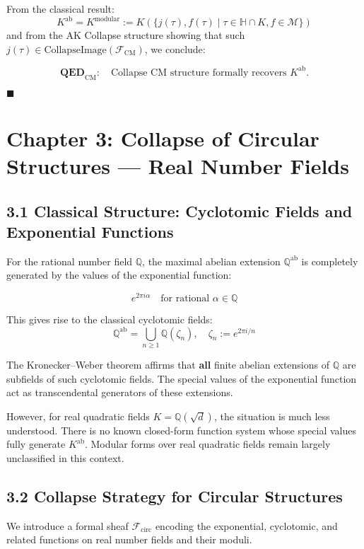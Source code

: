 \documentclass[11pt]{article}
\begin{document}
From the classical result:
\[
K^{\mathrm{ab}} = K^{\text{modular}} := K(\{ j(\tau), f(\tau) \mid \tau \in \mathbb{H} \cap K, f \in \mathcal{M} \})
\]
and from the AK Collapse structure showing that such \( j(\tau) \in \text{CollapseImage}(\mathcal{F}_{\mathrm{CM}}) \),  
we conclude:

\[
\textbf{QED}_{\mathrm{CM}}: \quad \text{Collapse CM structure formally recovers } K^{\mathrm{ab}}.
\]

\hfill $\blacksquare$



\section{Chapter 3: Collapse of Circular Structures — Real Number Fields}

\subsection{3.1 Classical Structure: Cyclotomic Fields and Exponential Functions}

For the rational number field \( \mathbb{Q} \), the maximal abelian extension \( \mathbb{Q}^{\mathrm{ab}} \) is completely generated by the values of the exponential function:

\[
e^{2\pi i \alpha} \quad \text{for rational } \alpha \in \mathbb{Q}
\]

This gives rise to the classical cyclotomic fields:
\[
\mathbb{Q}^{\mathrm{ab}} = \bigcup_{n \geq 1} \mathbb{Q}(\zeta_n), \quad \zeta_n := e^{2\pi i/n}
\]

The Kronecker–Weber theorem affirms that \textbf{all} finite abelian extensions of \( \mathbb{Q} \) are subfields of such cyclotomic fields. The special values of the exponential function act as transcendental generators of these extensions.

However, for real quadratic fields \( K = \mathbb{Q}(\sqrt{d}) \), the situation is much less understood. There is no known closed-form function system whose special values fully generate \( K^{\mathrm{ab}} \). Modular forms over real quadratic fields remain largely unclassified in this context.

\subsection{3.2 Collapse Strategy for Circular Structures}

We introduce a formal sheaf \( \mathcal{F}_{\mathrm{circ}} \) encoding the exponential, cyclotomic, and related functions on real number fields and their moduli.
\end{document}
